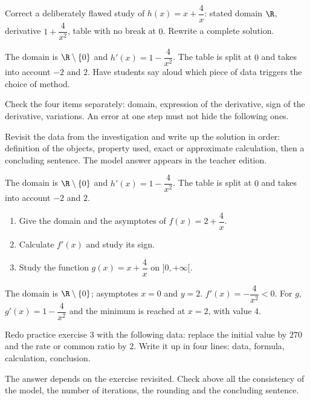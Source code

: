 \begin{activity}
Correct a deliberately flawed study of $h(x)=x+\dfrac4x$: stated domain $\R$, derivative $1+\dfrac4{x^2}$, table with no break at $0$. Rewrite a complete solution.

\end{activity}
\begin{solution}The domain is $\R\setminus\{0\}$ and $h'(x)=1-\dfrac4{x^2}$. The table is split at $0$ and takes into account $-2$ and $2$. Have students say aloud which piece of data triggers the choice of method.\end{solution}

\begin{summary}Check the four items separately: domain, expression of the derivative, sign of the derivative, variations. An error at one step must not hide the following ones.\end{summary}

\begin{example}
Revisit the data from the investigation and write up the solution in order: definition of the objects, property used, exact or approximate calculation, then a concluding sentence. The model answer appears in the teacher edition.
\end{example}
\begin{solution}The domain is $\R\setminus\{0\}$ and $h'(x)=1-\dfrac4{x^2}$. The table is split at $0$ and takes into account $-2$ and $2$.\end{solution}

\begin{exercise}[essential]
\begin{enumerate}\item Give the domain and the asymptotes of $f(x)=2+\dfrac{4}x$.\item Calculate $f'(x)$ and study its sign.\item Study the function $g(x)=x+\dfrac{4}x$ on $]0,+\infty[$.\end{enumerate}
\end{exercise}
\begin{solution}The domain is $\R\setminus\{0\}$; asymptotes $x=0$ and $y=2$. $f'(x)=-\dfrac{4}{x^2}<0$. For $g$, $g'(x)=1-\dfrac{4}{x^2}$ and the minimum is reached at $x=2$, with value $4$.\end{solution}


\begin{homework}Redo practice exercise 3 with the following data: replace the initial value by $270$ and the rate or common ratio by $2$. Write it up in four lines: data, formula, calculation, conclusion.\end{homework}
\begin{solution}The answer depends on the exercise revisited. Check above all the consistency of the model, the number of iterations, the rounding and the concluding sentence.\end{solution}

